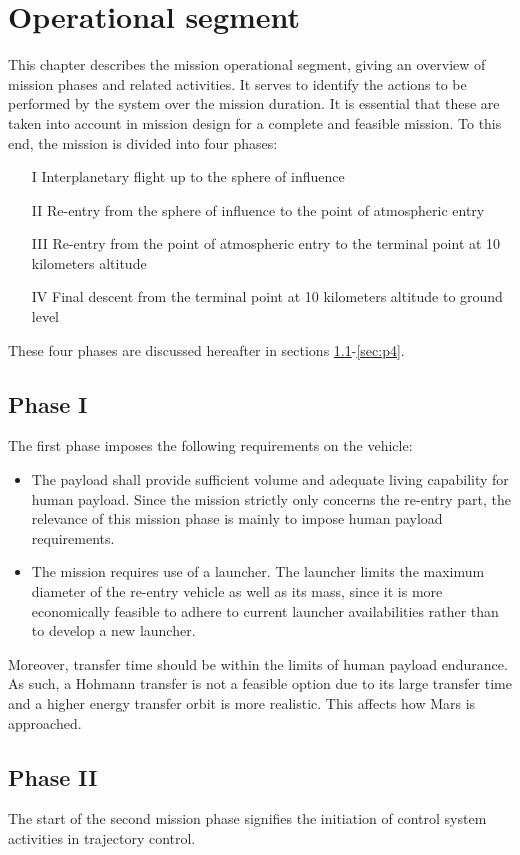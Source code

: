 \section{Operational segment}\label{cha:opseg}
This chapter describes the mission operational segment, giving an overview of mission phases and related activities. It serves to identify the actions to be performed by the system over the mission duration. It is essential that these are taken into account in mission design for a complete and feasible mission. To this end, the mission is divided into four phases: 
\begin{itemize}
\item[I]{Interplanetary flight up to the sphere of influence}
\item[II]{Re-entry from the sphere of influence to the point of atmospheric entry}
\item[III]{Re-entry from the point of atmospheric entry to the terminal point at 10 kilometers altitude}
\item[IV]{Final descent from the terminal point at 10 kilometers altitude to ground level}
\end{itemize}
These four phases are discussed hereafter in sections \ref{sec:p1}-\ref{sec:p4}.

\subsection{Phase I}\label{sec:p1}
The first phase imposes the following requirements on the vehicle:
\begin{itemize}
\item The payload shall provide sufficient volume and adequate living capability for human payload. Since the mission strictly only concerns the re-entry part, the relevance of this mission phase is mainly to impose human payload requirements. 
\item  The mission requires use of a launcher. The launcher limits the maximum diameter of the re-entry vehicle as well as its mass, since it is more economically feasible to adhere to current launcher availabilities rather than to develop a new launcher.
\end{itemize}
Moreover, transfer time should be within the limits of human payload endurance. As such, a Hohmann transfer is not a feasible option due to its large transfer time and a higher energy transfer orbit is more realistic. This affects how Mars is approached.

\subsection{Phase II}\label{sec:p2}
The start of the second mission phase signifies the initiation of control system activities in trajectory control.

